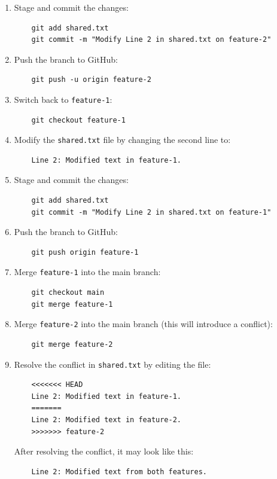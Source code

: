 \documentclass[a4paper,12pt]{article}
\begin{document}
\begin{enumerate}
    \item Stage and commit the changes:
    \begin{verbatim}
    git add shared.txt
    git commit -m "Modify Line 2 in shared.txt on feature-2"
    \end{verbatim}
    
    \item Push the branch to GitHub:
    \begin{verbatim}
    git push -u origin feature-2
    \end{verbatim}
    
    \item Switch back to \texttt{feature-1}:
    \begin{verbatim}
    git checkout feature-1
    \end{verbatim}
    
    \item Modify the \texttt{shared.txt} file by changing the second line to:
    \begin{verbatim}
    Line 2: Modified text in feature-1.
    \end{verbatim}
    
    \item Stage and commit the changes:
    \begin{verbatim}
    git add shared.txt
    git commit -m "Modify Line 2 in shared.txt on feature-1"
    \end{verbatim}
    
    \item Push the branch to GitHub:
    \begin{verbatim}
    git push origin feature-1
    \end{verbatim}
    
    \item Merge \texttt{feature-1} into the main branch:
    \begin{verbatim}
    git checkout main
    git merge feature-1
    \end{verbatim}
    
    \item Merge \texttt{feature-2} into the main branch (this will introduce a conflict):
    \begin{verbatim}
    git merge feature-2
    \end{verbatim}
    
    \item Resolve the conflict in \texttt{shared.txt} by editing the file:
    \begin{verbatim}
    <<<<<<< HEAD
    Line 2: Modified text in feature-1.
    =======
    Line 2: Modified text in feature-2.
    >>>>>>> feature-2
    \end{verbatim}
    After resolving the conflict, it may look like this:
    \begin{verbatim}
    Line 2: Modified text from both features.
    \end{verbatim}
    

\end{enumerate}
\end{document}
